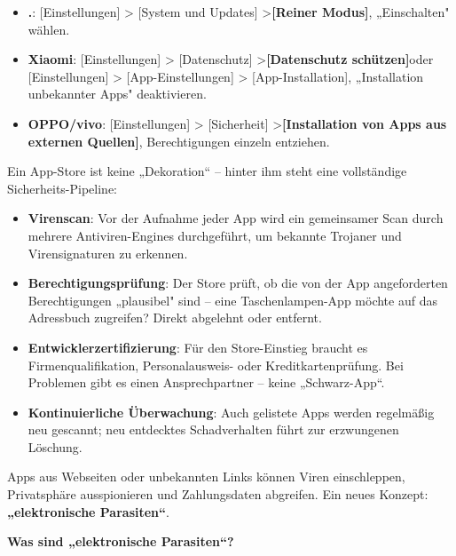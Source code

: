 
\begin{itemize}
  \item \textbf{.}: [Einstellungen] > [System und Updates] >\textbf{[Reiner Modus]}, „Einschalten" wählen.
  \item \textbf{Xiaomi}: [Einstellungen] > [Datenschutz] >\textbf{[Datenschutz schützen]}oder [Einstellungen] > [App-Einstellungen] > [App-Installation], „Installation unbekannter Apps" deaktivieren.
  \item \textbf{OPPO/vivo}: [Einstellungen] > [Sicherheit] >\textbf{[Installation von Apps aus externen Quellen]}, Berechtigungen einzeln entziehen.
\end{itemize}


Ein App-Store ist keine „Dekoration“ – hinter ihm steht eine vollständige Sicherheits-Pipeline:

\begin{itemize}
  \item \textbf{Virenscan}: Vor der Aufnahme jeder App wird ein gemeinsamer Scan durch mehrere Antiviren-Engines durchgeführt, um bekannte Trojaner und Virensignaturen zu erkennen.
  \item \textbf{Berechtigungsprüfung}: Der Store prüft, ob die von der App angeforderten Berechtigungen „plausibel" sind – eine Taschenlampen-App möchte auf das Adressbuch zugreifen? Direkt abgelehnt oder entfernt.
  \item \textbf{Entwicklerzertifizierung}: Für den Store-Einstieg braucht es Firmenqualifikation, Personalausweis- oder Kreditkartenprüfung. Bei Problemen gibt es einen Ansprechpartner – keine „Schwarz-App“.
  \item \textbf{Kontinuierliche Überwachung}: Auch gelistete Apps werden regelmäßig neu gescannt; neu entdecktes Schadverhalten führt zur erzwungenen Löschung.
\end{itemize}


Apps aus Webseiten oder unbekannten Links können Viren einschleppen, Privatsphäre ausspionieren und Zahlungsdaten abgreifen. Ein neues Konzept:\textbf{„elektronische Parasiten“}.

\textbf{Was sind „elektronische Parasiten“?}\par

